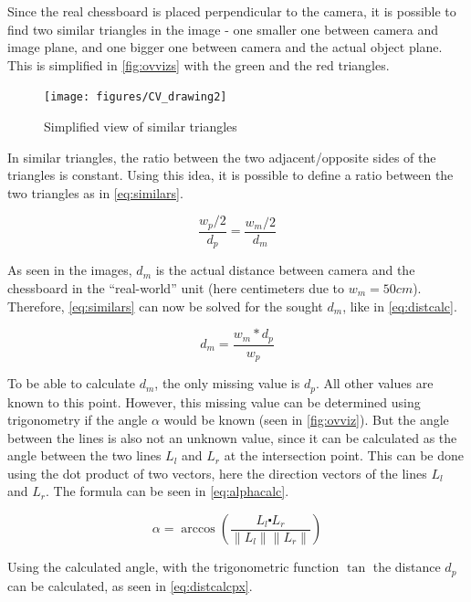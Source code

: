 Since the real chessboard is placed perpendicular to the camera, it is possible to find two similar triangles in the image - one smaller one between camera and image plane, and one bigger one between camera and the actual object plane. This is simplified in \autoref{fig:ovvizs} with the green and the red triangles.

\begin{figure}[h]
    \centering
    \texttt{[image: figures/CV\_drawing2]}
    \caption{Simplified view of similar triangles}
    \label{fig:ovvizs}
\end{figure}

In similar triangles, the ratio between the two adjacent/opposite sides of the triangles is constant. Using this idea, it is possible to define a ratio between the two triangles as in \autoref{eq:similars}.

\begin{equation} \label{eq:similars}
    \frac{w_p / 2}{d_p} = \frac{w_m / 2}{d_m}
\end{equation}

As seen in the images, $d_m$ is the actual distance between camera and the chessboard in the \enquote{real-world} unit (here centimeters due to $w_m = 50 cm$). Therefore, \autoref{eq:similars} can now be solved for the sought $d_m$, like in \autoref{eq:distcalc}.

\begin{equation} \label{eq:distcalc}
    d_m = \frac{w_m * d_p}{w_p}
\end{equation}

To be able to calculate $d_m$, the only missing value is $d_p$. All other values are known to this point. However, this missing value can be determined using trigonometry if the angle $\alpha$ would be known (seen in \autoref{fig:ovviz}). But the angle between the lines is also not an unknown value, since it can be calculated as the angle between the two lines $L_l$ and $L_r$ at the intersection point. This can be done using the dot product of two vectors, here the direction vectors of the lines $L_l$ and $L_r$. The formula can be seen in \autoref{eq:alphacalc}. \cite{dotproduct}

\begin{equation} \label{eq:alphacalc}
    \alpha = \arccos{ \left(
        \frac{ L_l \centerdot L_r}{\lVert L_l \rVert \lVert L_r \rVert}  
        \right)}
\end{equation}

Using the calculated angle, with the trigonometric function $\tan$ the distance $d_p$ can be calculated, as seen in \autoref{eq:distcalcpx}. \cite{trigo}

